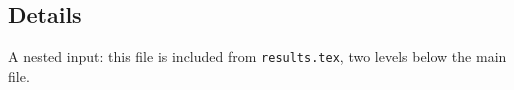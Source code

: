 \subsection{Details}
A nested input: this file is included from \texttt{results.tex}, two
levels below the main file.

